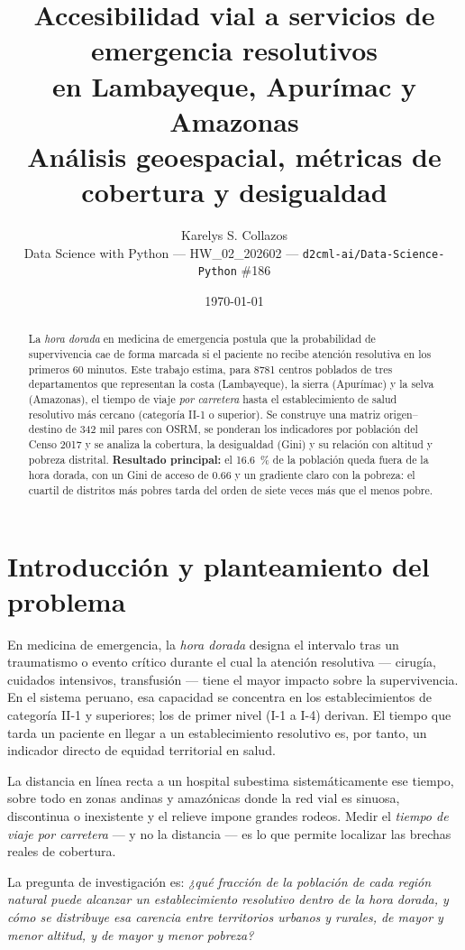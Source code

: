 \documentclass[11pt,a4paper]{article}
\title{\textbf{Accesibilidad vial a servicios de emergencia resolutivos\\
en Lambayeque, Apur\'imac y Amazonas}\\[0.3em]
\large An\'alisis geoespacial, m\'etricas de cobertura y desigualdad}
\author{Karelys S. Collazos \\
\small Data Science with Python --- HW\_02\_202602 --- \texttt{d2cml-ai/Data-Science-Python} \#186}
\date{\today}
\begin{document}
\maketitle

\begin{abstract}
\noindent
La \emph{hora dorada} en medicina de emergencia postula que la probabilidad de
supervivencia cae de forma marcada si el paciente no recibe atenci\'on
resolutiva en los primeros 60 minutos. Este trabajo estima, para
\num{8781} centros poblados de tres departamentos que representan la costa
(Lambayeque), la sierra (Apur\'imac) y la selva (Amazonas), el tiempo de viaje
\emph{por carretera} hasta el establecimiento de salud resolutivo m\'as cercano
(categor\'ia II-1 o superior). Se construye una matriz origen--destino de
\num{342} mil pares con OSRM, se ponderan los indicadores por poblaci\'on del
Censo 2017 y se analiza la cobertura, la desigualdad (Gini) y su relaci\'on con
altitud y pobreza distrital. \textbf{Resultado principal:} el
\SI{16.6}{\percent} de la poblaci\'on queda fuera de la hora dorada, con un Gini
de acceso de \num{0.66} y un gradiente claro con la pobreza: el cuartil de
distritos m\'as pobres tarda del orden de siete veces m\'as que el menos pobre.
\end{abstract}

\section{Introducci\'on y planteamiento del problema}

En medicina de emergencia, la \emph{hora dorada} designa el intervalo tras un
traumatismo o evento cr\'itico durante el cual la atenci\'on resolutiva
--- cirug\'ia, cuidados intensivos, transfusi\'on --- tiene el mayor impacto
sobre la supervivencia. En el sistema peruano, esa capacidad se concentra en
los establecimientos de categor\'ia II-1 y superiores; los de primer nivel
(I-1 a I-4) derivan. El tiempo que tarda un paciente en llegar a un
establecimiento resolutivo es, por tanto, un indicador directo de equidad
territorial en salud.

La distancia en l\'inea recta a un hospital subestima sistem\'aticamente ese
tiempo, sobre todo en zonas andinas y amaz\'onicas donde la red vial es
sinuosa, discontinua o inexistente y el relieve impone grandes rodeos. Medir
el \emph{tiempo de viaje por carretera} --- y no la distancia --- es lo que
permite localizar las brechas reales de cobertura.

La pregunta de investigaci\'on es: \emph{¿qu\'e fracci\'on de la poblaci\'on de
cada regi\'on natural puede alcanzar un establecimiento resolutivo dentro de la
hora dorada, y c\'omo se distribuye esa carencia entre territorios urbanos y
rurales, de mayor y menor altitud, y de mayor y menor pobreza?}
\end{document}
